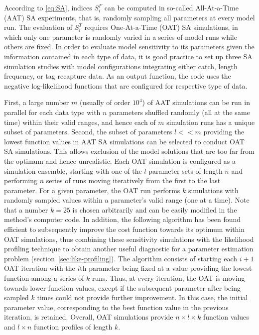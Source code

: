 According to \hyperref[eq:SA]{\ref*{eq:SA}}, indices $S^F_i$ can be computed in so-called All-At-a-Time (AAT) SA experiments, that is, randomly sampling all parameters at every model run. The evaluation of $S^T_i$ requires One-At-a-Time (OAT) SA simulations, in which only one parameter is randomly varied in a series of model runs while others are fixed. In order to evaluate model sensitivity to its parameters given the information contained in each type of data, it is good practice to set up three SA simulation studies with model configurations integrating either catch, length frequency, or tag recapture data. As an output function, the code uses the negative log-likelihood functions that are configured for respective type of data.

First, a large number $m$ (usually of order $10^4$) of AAT simulations can be run in parallel for each data type with $n$ parameters shuffled randomly (all at the same time) within their valid ranges, and hence each of $m$ simulation runs has a unique subset of parameters. Second, the subset of parameters $l<<m$ providing the lowest function values in AAT SA simulations can be selected to conduct OAT SA simulations. This allows exclusion of the model solutions that are too far from the optimum and hence unrealistic. Each OAT simulation is configured as a simulation ensemble, starting with one of the $l$ parameter sets of length $n$ and performing $n$ series of runs moving iteratively from the first to the last parameter. For a given parameter, the OAT run performs $k$ simulations with randomly sampled values within a parameter's valid range (one at a time). Note that a number $k=25$ is chosen arbitrarily and can be easily modified in the method's computer code. In addition, the following algorithm has been found efficient to subsequently improve the cost function towards its optimum within OAT simulations, thus combining these sensitivity simulations with the likelihood profiling technique to obtain another useful diagnostic for a parameter estimation problem (section~\ref{sec:like-profiling}). The algorithm consists of starting each $i+1$ OAT iteration with the $i$th parameter being fixed at a value providing the lowest function among a series of $k$ runs. Thus, at every iteration, the OAT is moving towards lower function values, except if the subsequent parameter after being sampled $k$ times could not provide further improvement. In this case, the initial parameter value, corresponding to the best function value in the previous iteration, is retained. Overall, OAT simulations provide $n \times l \times k$ function values and $l \times n$ function profiles of length $k$.

